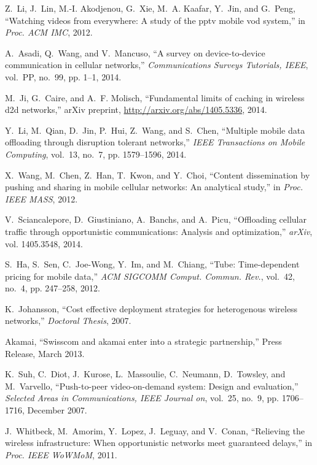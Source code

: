 \documentclass[10pt,conference,letterpaper]{IEEEtran}
\begin{document}
\begin{thebibliography}{10}
Z.~Li, J.~Lin, M.-I. Akodjenou, G.~Xie, M.~A. Kaafar, Y.~Jin, and G.~Peng,
  ``Watching videos from everywhere: A study of the pptv mobile vod system,''
  in \emph{Proc. ACM IMC}, 2012.

A.~Asadi, Q.~Wang, and V.~Mancuso, ``A survey on device-to-device communication
  in cellular networks,'' \emph{Communications Surveys Tutorials, IEEE},
  vol.~PP, no.~99, pp. 1--1, 2014.

M.~Ji, G.~Caire, and A.~F. Molisch, ``Fundamental limits of caching in wireless
  d2d networks,'' arXiv preprint, \url{http://arxiv.org/abs/1405.5336}, 2014.

Y.~Li, M.~Qian, D.~Jin, P.~Hui, Z.~Wang, and S.~Chen, ``Multiple mobile data
  offloading through disruption tolerant networks,'' \emph{IEEE Transactions on
  Mobile Computing}, vol.~13, no.~7, pp. 1579--1596, 2014.

X.~Wang, M.~Chen, Z.~Han, T.~Kwon, and Y.~Choi, ``Content dissemination by
  pushing and sharing in mobile cellular networks: An analytical study,'' in
  \emph{Proc. IEEE MASS}, 2012.

V.~Sciancalepore, D.~Giustiniano, A.~Banchs, and A.~Picu, ``Offloading cellular
  traffic through opportunistic communications: Analysis and optimization,''
  \emph{arXiv}, vol. 1405.3548, 2014.

S.~Ha, S.~Sen, C.~Joe-Wong, Y.~Im, and M.~Chiang, ``Tube: Time-dependent
  pricing for mobile data,'' \emph{ACM SIGCOMM Comput. Commun. Rev.}, vol.~42,
  no.~4, pp. 247--258, 2012.

K.~Johansson, ``Cost effective deployment strategies for heterogenous wireless
  networks,'' \emph{Doctoral Thesis}, 2007.

{Akamai}, ``Swisscom and akamai enter into a strategic partnership,'' Press
  Release, March 2013.

K.~Suh, C.~Diot, J.~Kurose, L.~Massoulie, C.~Neumann, D.~Towsley, and
  M.~Varvello, ``Push-to-peer video-on-demand system: Design and evaluation,''
  \emph{Selected Areas in Communications, IEEE Journal on}, vol.~25, no.~9, pp.
  1706--1716, December 2007.

J.~Whitbeck, M.~Amorim, Y.~Lopez, J.~Leguay, and V.~Conan, ``Relieving the
  wireless infrastructure: When opportunistic networks meet guaranteed
  delays,'' in \emph{Proc. IEEE WoWMoM}, 2011.


\end{thebibliography}
\end{document}
